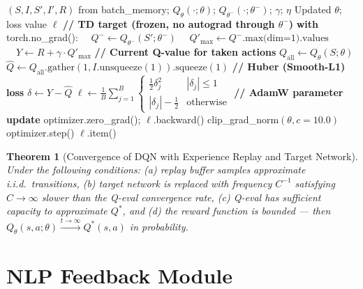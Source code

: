 \documentclass[12pt,a4paper]{article}
\theoremstyle{definition}
\theoremstyle{plain}
\newtheorem{theorem}{Theorem}[section]
\theoremstyle{remark}
\newcommand{\Qeval}{Q_\theta}
\newcommand{\Qtgt}{Q_{\theta^-}}
\begin{document}
\begin{algorithm}[H]
\caption{Full DQN Loss Computation and Optimisation Step}
\label{alg:dqn_loss}
\begin{algorithmic}[1]
\Require $(S, I, S', I', R)$ from batch\_memory; $\Qeval(\cdot;\theta)$; $\Qtgt(\cdot;\theta^-)$; $\gamma$; $\eta$
\Ensure Updated $\theta$; loss value $\ell$
\State \textbf{// TD target (frozen, no autograd through $\theta^-$)}
\State \textbf{with} torch.no\_grad():
\State $\quad Q^- \gets \Qtgt(S';\theta^-)$ \Comment{$[B, |\mathcal{A}|]$}
\State $\quad Q'_{\max} \gets Q^-.\text{max(dim=1).values}$ 
\State $\quad Y \gets R + \gamma \cdot Q'_{\max}$ 
\State \textbf{// Current Q-value for taken actions}
\State $Q_{\text{all}} \gets \Qeval(S;\theta)$ \Comment{$[B, |\mathcal{A}|]$}
\State $\hat{Q} \gets Q_{\text{all}}.\text{gather}(1, I.\text{unsqueeze}(1)).\text{squeeze}(1)$ \Comment{$[B]$}
\State \textbf{// Huber (Smooth-L1) loss}
\State $\delta \gets Y - \hat{Q}$ 
\State $\ell \gets \frac{1}{B}\sum_{j=1}^B \begin{cases} \frac{1}{2}\delta_j^2 & |\delta_j| \le 1 \\ |\delta_j| - \frac{1}{2} & \text{otherwise} \end{cases}$
\State \textbf{// AdamW parameter update}
\State optimizer.zero\_grad(); $\ell$.backward()
\State clip\_grad\_norm$(\theta, c=10.0)$ 
\State optimizer.step()
\State \Return $\ell$.item()
\end{algorithmic}
\end{algorithm}

\begin{theorem}[Convergence of DQN with Experience Replay and Target Network]
Under the following conditions: (a) replay buffer samples approximate i.i.d.\ transitions, (b) target network is replaced with frequency $C^{-1}$ satisfying $C \to \infty$ slower than the Q-eval convergence rate, (c) Q-eval has sufficient capacity to approximate $Q^*$, and (d) the reward function is bounded — then $\Qeval(s,a;\theta) \xrightarrow{t\to\infty} Q^*(s,a)$ in probability.
\end{theorem}

\newpage
\section{NLP Feedback Module}
\label{sec:nlp}
\end{document}
